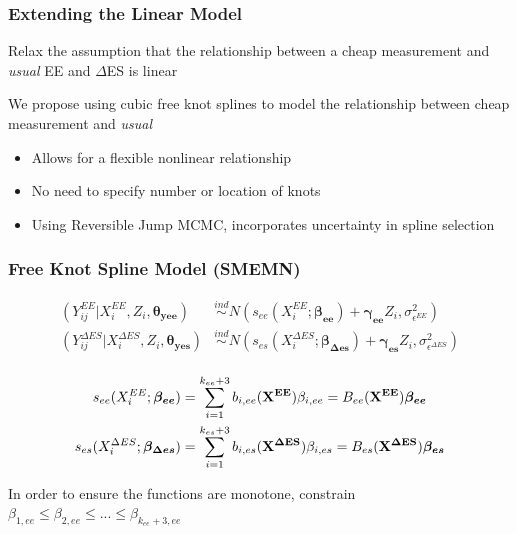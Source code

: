 \documentclass[handout]{beamer}\usepackage[]{graphicx}\usepackage[]{color}
\begin{document}
\begin{frame}
\frametitle{Extending the Linear Model}
Relax the assumption that the relationship between a cheap measurement and \emph{usual} EE and $\Delta$ES is linear \\

\vspace{0.5cm}

We propose using cubic free knot splines to model the relationship between cheap  measurement and \emph{usual}

\begin{itemize}
\item
Allows for a flexible nonlinear relationship
\item
No need to specify number or location of knots
\item
Using Reversible Jump MCMC, incorporates uncertainty in spline selection

\end{itemize}


\end{frame}


\begin{frame}
\frametitle{Free Knot Spline Model (SMEMN)}

\begin{align*}
  (Y_{ij}^{EE}|X_i^{EE},Z_i,\boldsymbol{\theta_{yee}}) &\overset{ind}{\sim} N(s_{ee}(X_i^{EE};\boldsymbol{\beta_{ee}}) + \boldsymbol{\gamma_{ee}}Z_i,\sigma_{\epsilon^{EE}}^2) \\
    (Y_{ij}^{\Delta ES}|X_i^{\Delta ES},Z_i,\boldsymbol{\theta_{yes}}) &\overset{ind}{\sim} N(s_{es}(X_i^{\Delta ES};\boldsymbol{\beta_{\Delta es}}) + \boldsymbol{\gamma_{es}}Z_i,\sigma_{\epsilon^{\Delta ES}}^2) \\
\end{align*}

\begin{align*}
  s_{ee}(X_i^{EE};\boldsymbol{\beta_{ee}}) &= \sum_{i=1}^{k_{ee}+3} b_{i,ee}({\bf X^{EE}}) \beta_{i,ee} = B_{ee}({\bf X^{EE}}) \boldsymbol{\beta_{ee}}\\
  s_{es}(X_i^{\Delta ES};\boldsymbol{\beta_{\Delta es}}) &= \sum_{i=1}^{k_{es}+3} b_{i,es}({\bf X^{\Delta ES}}) \beta_{i,es} = B_{es}({\bf X^{\Delta ES}}) \boldsymbol{\beta_{es}}
\end{align*}

In order to ensure the functions are monotone, constrain $\beta_{1,ee} \leq \beta_{2,ee} \leq ... \leq \beta_{k_{ee}+3,ee}$ 

% 
% 

\end{frame}
\end{document}
